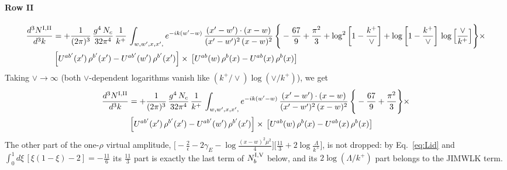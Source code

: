 \documentclass[9pt]{article}
\numberwithin{equation}{section}
\begin{document}
\paragraph{Row II}
\begin{align}
     \frac{d^{3}N^{\rm I,II}}{d^{3}k} &  =  +\frac{1}{(2\pi)^{3}}\, \frac{g^{4}\,N_{c}}{32\pi^{4}}\,\frac{1}{k^{+}}\, \int_{w, w',x,x',} e^{-ik(w^\prime-w)}\, \frac{(x'-w')\cdot (x-w)}{(x'-w')^{2}\, (x-w)^{2}}\, \Bigg\{ -\frac{67}{9}+\frac{\pi^{2}}{3}+\log^{2}{\left[1-\frac{k^{+}}{\vee}\right]}+\log{\left[1-\frac{k^{+}}{\vee}\right]}\,\log{\left[\frac{\vee}{k^{+}}\right]}\Bigg\}\times\notag \\ & \left[U^{ab'}(x')\,\rho^{b'}(x') - U^{ab'}(w')\,\rho^{b'}(x')\right]\times\,\left[U^{ab}(w)\,\rho^{b}(x) - U^{ab}(x)\,\rho^{b}(x)\right]
\end{align}  
Taking $\vee\to \infty$ (both $\vee$-dependent logarithms vanish like $(k^{+}/\vee)\log(\vee/k^{+})$), we get
\begin{align}
     \frac{d^{3}N^{\rm I,II}}{d^{3}k} &  =  +\frac{1}{(2\pi)^{3}}\, \frac{g^{4}\,N_{c}}{32\pi^{4}}\,\frac{1}{k^{+}}\, \int_{w, w',x,x',} e^{-ik(w^\prime-w)}\, \frac{(x'-w')\cdot (x-w)}{(x'-w')^{2}\, (x-w)^{2}}\, \Bigg\{ -\frac{67}{9}+\frac{\pi^{2}}{3}\Bigg\}\times\notag \\ & \left[U^{ab'}(x')\,\rho^{b'}(x') - U^{ab'}(w')\,\rho^{b'}(x')\right]\times\,\left[U^{ab}(w)\,\rho^{b}(x) - U^{ab}(x)\,\rho^{b}(x)\right]
\end{align}  
The other part of the one-$\rho$ virtual amplitude, $\big[-\tfrac{2}{\epsilon}-2\gamma_{E}-\log\tfrac{(x-w)^{2}\mu^{2}}{4}\big]\big[\tfrac{11}{3}+2\log\tfrac{\Lambda}{k^{+}}\big]$, is not dropped: by Eq.~\eqref{eq:Lid} and $\int_{0}^{1}d\xi\,[\xi(1-\xi)-2]=-\tfrac{11}{6}$ its $\tfrac{11}{3}$ part is exactly the last term of $N^{\rm I,V}_{b}$ below, and its $2\log(\Lambda/k^{+})$ part belongs to the JIMWLK term.
\end{document}
